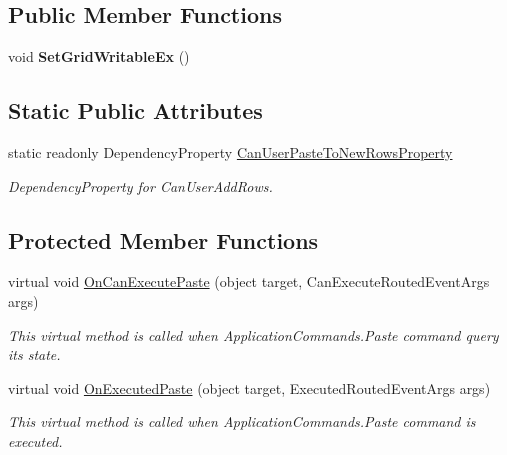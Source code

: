 \subsection*{Public Member Functions}
\begin{DoxyCompactItemize}
\item 
void {\bfseries Set\+Grid\+Writable\+Ex} ()\hypertarget{class_power_system_planning_wpf_app_1_1_control_utils_1_1_custom_data_grid_acbd04f519f5b4788fc8a9699bb005d04}{}\label{class_power_system_planning_wpf_app_1_1_control_utils_1_1_custom_data_grid_acbd04f519f5b4788fc8a9699bb005d04}

\end{DoxyCompactItemize}
\subsection*{Static Public Attributes}
\begin{DoxyCompactItemize}
\item 
static readonly Dependency\+Property \hyperlink{class_power_system_planning_wpf_app_1_1_control_utils_1_1_custom_data_grid_a2521d8f0307ab66a4fa0c1c31c305332}{Can\+User\+Paste\+To\+New\+Rows\+Property}
\begin{DoxyCompactList}\small\item\em Dependency\+Property for Can\+User\+Add\+Rows. \end{DoxyCompactList}\end{DoxyCompactItemize}
\subsection*{Protected Member Functions}
\begin{DoxyCompactItemize}
\item 
virtual void \hyperlink{class_power_system_planning_wpf_app_1_1_control_utils_1_1_custom_data_grid_ad62754f9382daa406815f7965d6af785}{On\+Can\+Execute\+Paste} (object target, Can\+Execute\+Routed\+Event\+Args args)
\begin{DoxyCompactList}\small\item\em This virtual method is called when Application\+Commands.\+Paste command query its state. \end{DoxyCompactList}\item 
virtual void \hyperlink{class_power_system_planning_wpf_app_1_1_control_utils_1_1_custom_data_grid_a7a8455f1c46a856165914960a0e60418}{On\+Executed\+Paste} (object target, Executed\+Routed\+Event\+Args args)
\begin{DoxyCompactList}\small\item\em This virtual method is called when Application\+Commands.\+Paste command is executed. \end{DoxyCompactList}\end{DoxyCompactItemize}
